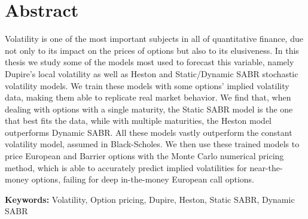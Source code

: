 
\section*{Abstract}

Volatility is one of the most important subjects in all of quantitative finance, due not only to its impact on the prices of options but also to its elusiveness. In this thesis we study some of the models most used to forecast this variable, namely Dupire's local volatility as well as Heston and Static/Dynamic SABR stochastic volatility models.
We train these models with some options' implied volatility data, making them able to replicate real market behavior. We find that, when dealing with options with a single maturity, the Static SABR model is the one that best fits the data, while with multiple maturities, the Heston model outperforms Dynamic SABR. All these models vastly outperform the constant volatility model, assumed in Black-Scholes.
We then use these trained models to price European and Barrier options with the Monte Carlo numerical pricing method, which is able to accurately predict implied volatilities for near-the-money options, failing for deep in-the-money European call options.

\vfill

\textbf{\Large Keywords:} Volatility, Option pricing, Dupire, Heston, Static SABR, Dynamic SABR

